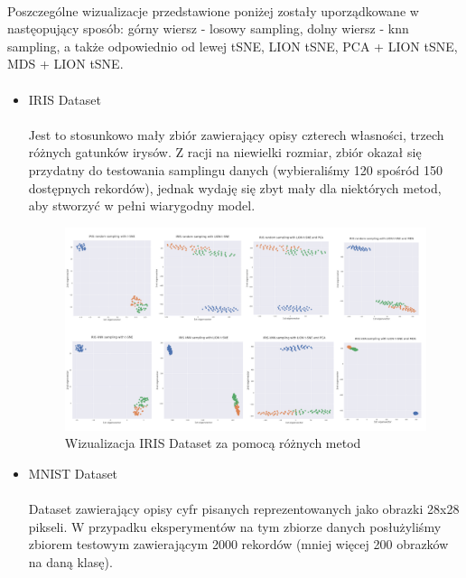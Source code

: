 \documentclass{article}
\begin{document}
\paragraph{}
Poszczególne wizualizacje przedstawione poniżej zostały uporządkowane w nastęopujący sposób:
górny wiersz - losowy sampling, dolny wiersz - knn sampling, a także odpowiednio od lewej tSNE, LION tSNE, PCA + LION tSNE, MDS + LION tSNE.  

\paragraph{}
\begin{itemize}
    \item IRIS Dataset \cite{iris-dataset}
    \paragraph{}
    Jest to stosunkowo mały zbiór zawierający opisy czterech własności, trzech różnych
    gatunków irysów. Z racji na niewielki rozmiar, zbiór okazał się przydatny do testowania
    samplingu danych (wybieraliśmy 120 spośród 150 dostępnych rekordów), jednak wydaję
    się zbyt mały dla niektórych metod, aby stworzyć w pełni wiarygodny model.
    
    
\begin{figure}[h]
\includegraphics[scale=0.25]{iris-dataset-results.png}
\caption{Wizualizacja IRIS Dataset za pomocą różnych metod}
\end{figure}
    
    \item MNIST Dataset \cite{mnist-dataset}
    \paragraph{}
    Dataset zawierający opisy cyfr pisanych reprezentowanych jako obrazki 28x28 pikseli. W
    przypadku eksperymentów na tym zbiorze danych posłużyliśmy zbiorem testowym
    zawierającym 2000 rekordów (mniej więcej 200 obrazków na daną klasę).



\end{itemize}
\end{document}

